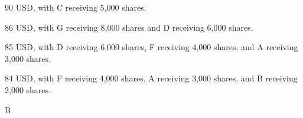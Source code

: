 \documentclass{article}
\begin{document}
        \begin{choices}
            \item 90 USD, with C receiving 5,000 shares.
            \item 86 USD, with G receiving 8,000 shares and D receiving 6,000 shares.
            \item 85 USD, with D receiving 6,000 shares, F receiving 4,000 shares, and A receiving 3,000 shares.
            \item 84 USD, with F receiving 4,000 shares, A receiving 3,000 shares, and B receiving 2,000 shares.
        \end{choices}
        
        \begin{correctanswer}
        B
        \end{correctanswer}
        
\end{document}
